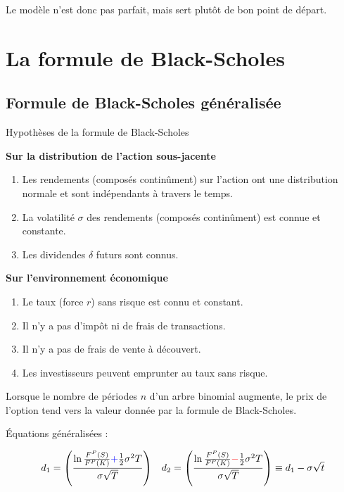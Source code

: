 \documentclass[10pt, french]{article}
\begin{document}
\begin{multicols*}{2}
Le modèle n'est donc pas parfait, mais sert plutôt de bon point de départ.

\newpage
\section{La formule de Black-Scholes}

\subsection{Formule de Black-Scholes généralisée}
\begin{conceptgen}{Hypothèses de la formule de Black-Scholes}
\begin{center}
	\textbf{Sur la distribution de l'action sous-jacente}
\end{center}
\begin{enumerate}[leftmargin = *, label = \alph*)]
	\item	Les rendements (composés continûment) sur l'action ont une distribution normale et sont indépendants à travers le temps.
	\item	La volatilité $\sigma$ des rendements (composés continûment) est connue et constante.
	\item	Les dividendes $\delta$ futurs sont connus.
\end{enumerate}
\tcbline
\begin{center}
	\textbf{Sur l'environnement économique}
\end{center}
\begin{enumerate}[leftmargin = *, label = \alph*)]
	\item	Le taux (force $r$) sans risque est connu et constant.
	\item	Il n'y a pas d'impôt	 ni de frais de transactions.
	\item	Il n'y a pas de frais de vente à découvert.
	\item	Les investisseurs peuvent emprunter au taux sans risque.
\end{enumerate}
\end{conceptgen}

Lorsque le nombre de périodes $n$ d'un arbre binomial augmente, le prix de l'option tend vers la valeur donnée par la formule de Black-Scholes.

\begin{definitionNOHFILL}
Équations généralisées :

\begin{align*}
	d_{1}
	&=	\left(
			\frac{\ln\frac{F^{P}(S)}{F^{P}(K)} {\color{blue}{+}} \frac{1}{2} \sigma^{2} T}
	 			 {\sigma\sqrt{T}}
		\right)	&
	d_{2}
	&=	\left(
			\frac{\ln\frac{F^{P}(S)}{F^{P}(K)} {\color{red}{-}} \frac{1}{2} \sigma^{2} T}
	 			 {\sigma\sqrt{T}}
		\right)	
	\equiv	d_{1} - \sigma \sqrt{t}	\\
\end{align*}


\end{definitionNOHFILL}
\end{multicols*}
\end{document}
